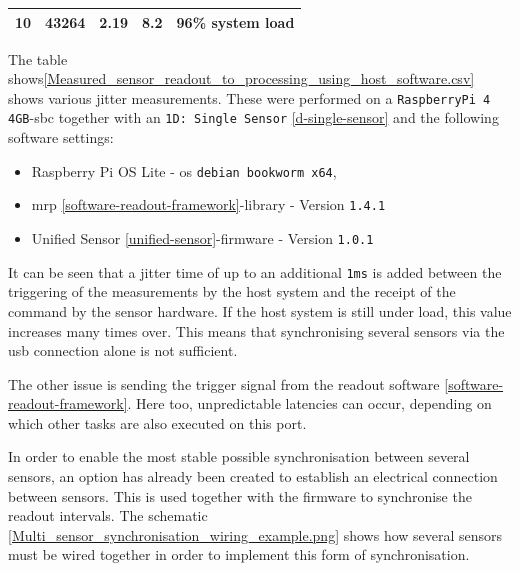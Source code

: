 \begin{longtable}[]{@{}lllll@{}}
\begin{minipage}[t]{0.08\columnwidth}\raggedright
10\strut
\end{minipage} & \begin{minipage}[t]{0.11\columnwidth}\raggedright
43264\strut
\end{minipage} & \begin{minipage}[t]{0.35\columnwidth}\raggedright
2.19\strut
\end{minipage} & \begin{minipage}[t]{0.22\columnwidth}\raggedright
8.2\strut
\end{minipage} & \begin{minipage}[t]{0.10\columnwidth}\raggedright
96\% system load\strut
\end{minipage}\tabularnewline
\bottomrule
\end{longtable}

The table
shows\ref{Measured_sensor_readout_to_processing_using_host_software.csv}
shows various jitter measurements. These were performed on a
\passthrough{\lstinline!RaspberryPi 4 4GB!}-\gls{sbc} together with an
\passthrough{\lstinline!1D: Single Sensor!} \ref{d-single-sensor} and
the following software settings:

\begin{itemize}
\tightlist
\item
  Raspberry Pi OS Lite - \gls{os}
  \passthrough{\lstinline!debian bookworm x64!},
\item
  \gls{mrp} \ref{software-readout-framework}-library - Version
  \passthrough{\lstinline!1.4.1!}
\item
  Unified Sensor \ref{unified-sensor}-firmware - Version
  \passthrough{\lstinline!1.0.1!}
\end{itemize}

It can be seen that a jitter time of up to an additional
\passthrough{\lstinline!1ms!} is added between the triggering of the
measurements by the host system and the receipt of the command by the
sensor hardware. If the host system is still under load, this value
increases many times over. This means that synchronising several sensors
via the \gls{usb} connection alone is not sufficient.

The other issue is sending the trigger signal from the readout software
\ref{software-readout-framework}. Here too, unpredictable latencies can
occur, depending on which other tasks are also executed on this port.

In order to enable the most stable possible synchronisation between
several sensors, an option has already been created to establish an
electrical connection between sensors. This is used together with the
firmware to synchronise the readout intervals. The schematic
\ref{Multi_sensor_synchronisation_wiring_example.png} shows how several
sensors must be wired together in order to implement this form of
synchronisation.

